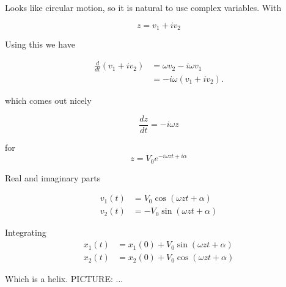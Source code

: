 {Looks like circular motion, so it is natural to use complex variables.  With

\begin{equation}\label{eqn:relativisticElectrodynamicsT3:740}
z = v_1 + i v_2
\end{equation}

Using this we have

\begin{equation}\label{eqn:relativisticElectrodynamicsT3:1130}
\begin{aligned}
\frac{d}{dt} ( v_1 + i v_2 ) 
&= 
\omega v_2 - i \omega v_1  \\
&= -i \omega ( v_1 + i v_2 ).
\end{aligned}
\end{equation}

which comes out nicely

\begin{equation}\label{eqn:relativisticElectrodynamicsT3:751}
\frac{dz}{dt} = -i \omega z
\end{equation}

for
\begin{equation}\label{eqn:relativisticElectrodynamicsT3:780}
z = V_0 e^{-i \omega z t + i \alpha}
\end{equation}

Real and imaginary parts

\begin{equation}\label{eqn:relativisticElectrodynamicsT3:800}
\begin{aligned}
v_1(t) &= V_0 \cos( \omega z t + \alpha) \\
v_2(t) &= -V_0 \sin( \omega z t + \alpha)
\end{aligned}
\end{equation}

Integrating
\begin{equation}\label{eqn:relativisticElectrodynamicsT3:820}
\begin{aligned}
x_1(t) &= x_1(0) + V_0 \sin( \omega z t + \alpha) \\
x_2(t) &= x_2(0) + V_0 \cos( \omega z t + \alpha)
\end{aligned}
\end{equation}

Which is a helix.
PICTURE: ...
} %

